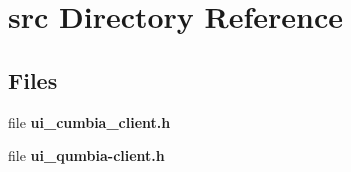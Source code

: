 \section{src Directory Reference}
\label{dir_68267d1309a1af8e8297ef4c3efbcdba}
\subsection*{Files}
\begin{DoxyCompactItemize}
\item 
file \textbf{ ui\+\_\+cumbia\+\_\+client.\+h}
\item 
file \textbf{ ui\+\_\+qumbia-\/client.\+h}
\end{DoxyCompactItemize}
